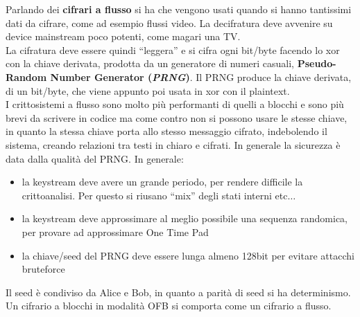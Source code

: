 \documentclass[a4paper,12pt, oneside]{book}
\begin{document}
Parlando dei \textbf{cifrari a flusso} si ha che vengono usati quando si hanno
tantissimi dati da cifrare, come ad esempio flussi video. La decifratura deve
avvenire su device mainstream poco potenti, come magari una TV.\\
La cifratura deve essere quindi ``leggera'' e si cifra ogni bit/byte facendo lo
xor con la chiave derivata, prodotta da un generatore di numeri casuali,
\textbf{Pseudo-Random Number Generator (\textit{PRNG})}. Il PRNG produce la
chiave derivata, di un bit/byte, che viene appunto poi usata in xor con il
plaintext.\\
I crittosistemi a flusso sono molto più performanti di quelli a blocchi e sono
più brevi da scrivere in codice ma come contro non si possono usare le stesse
chiave, in quanto la stessa chiave porta allo stesso messaggio cifrato,
indebolendo il sistema, creando relazioni tra testi in chiaro e cifrati. In
generale la sicurezza è data dalla qualità del PRNG. In generale:
\begin{itemize}
  \item la keystream deve avere un grande periodo, per rendere difficile la
  crittoanalisi. Per questo si riusano ``mix'' degli stati interni etc$\ldots$
  \item la keystream deve approssimare al meglio possibile una sequenza
  randomica, per provare ad approssimare One Time Pad
  \item la chiave/seed del PRNG deve essere lunga almeno 128bit per evitare
  attacchi bruteforce
\end{itemize}
Il seed è condiviso da Alice e Bob, in quanto a parità di seed si ha
determinismo.\\  
Un cifrario a blocchi in modalità OFB si comporta come un cifrario a flusso.\\
\end{document}
